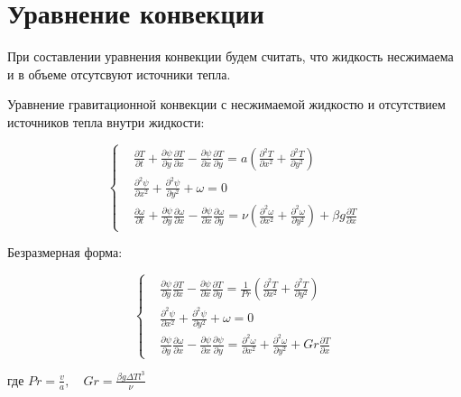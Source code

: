 \documentclass[a4paper, 12pt]{article}
\newcommand{\der}[2]{\frac{\partial {#1}}{\partial {#2}}}
\newcommand{\dder}[2]{\frac{\partial^2 {#1}}{\partial {#2}^2}}
\begin{document}
\begin{center}
\end{center}

  \pagebreak

  \section{Уравнение конвекции}
    При составлении уравнения конвекции будем считать, что жидкость несжимаема и
    в объеме отсутсвуют источники тепла.

    Уравнение гравитационной конвекции с несжимаемой жидкостю и отсутствием
    источников тепла внутри жидкости:

    $$
      \left\{
        \begin{aligned}
          &\der{T}{t} + \der{\psi}{y} \der{T}{x} - \der{\psi}{x} \der{T}{y} =
            a \left( \dder{T}{x} + \dder{T}{y} \right)
          \\
          &\dder{\psi}{x} + \dder{\psi}{y} + \omega = 0
          \\
          &\der{\omega}{t} + \der{\psi}{y} \der{\omega}{x} - \der{\psi}{x}
            \der{\omega}{y} = \nu \left(
              \dder{\omega}{x} + \dder{\omega}{y}
            \right) + \beta g \der{T}{x}
        \end{aligned}
      \right.
    $$

    Безразмерная форма:

    $$
      \left\{
        \begin{aligned}
          &\der{\psi}{y} \der{T}{x} - \der{\psi}{x} \der{T}{y} = \frac{1}{Pr}
            \left( \dder{T}{x} + \dder{T}{y} \right)
          \\
          &\dder{\psi}{x} + \dder{\psi}{y} + \omega = 0
          \\
          &\der{\psi}{y} \der{\omega}{x} - \der{\psi}{x} \der{\psi}{y} =
            \dder{\omega}{x} + \dder{\omega}{y} + Gr \der{T}{x}
        \end{aligned}
      \right.
    $$

    где $Pr = \frac{v}{a}, \quad Gr = \frac{\beta g \Delta T l^{3}}{\nu}$
  \pagebreak
\end{document}
